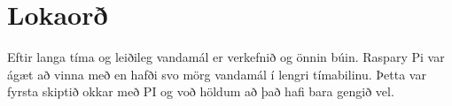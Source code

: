 \section{Lokaorð}
 Eftir langa tíma og leiðileg vandamál er verkefnið og önnin búin. Raspary Pi var ágæt að vinna með en hafði svo mörg vandamál í lengri tímabilinu. Þetta var fyrsta skiptið okkar með PI og voð höldum að það hafi bara gengið vel.\cite{brock}